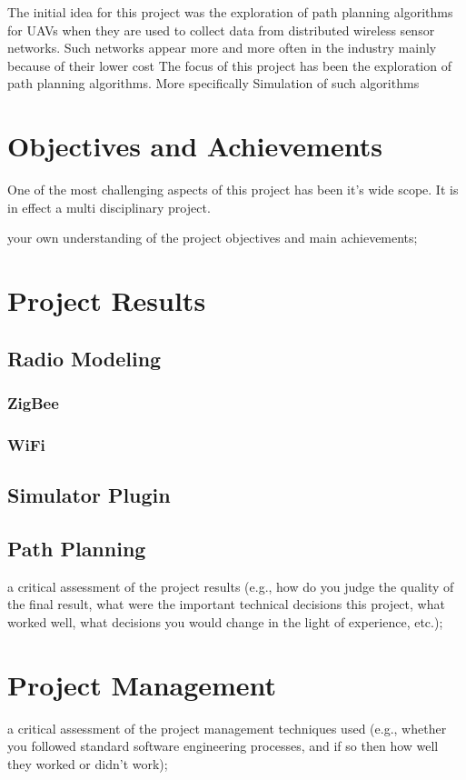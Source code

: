 The initial idea for this project was the exploration of path planning
algorithms for UAVs when they are used to collect data from distributed wireless
sensor networks. Such networks appear more and more often in the industry mainly
because of their lower cost
The focus of this project has been the exploration of path planning algorithms.
More specifically
Simulation of such algorithms

\section{Objectives and Achievements}
One of the most challenging aspects of this project has been it's wide scope. It
is in effect a multi disciplinary project.


your own understanding of the project objectives and main achievements;

\section{Project Results}
\subsection{Radio Modeling}
\subsubsection{ZigBee}
\subsubsection{WiFi}
\subsection{Simulator Plugin}
\subsection{Path Planning}
a critical assessment of the project results (e.g., how do you judge the
quality of the final result, what were the important technical decisions
this project, what worked well, what decisions you would change in the light
of experience, etc.);

\section{Project Management}
a critical assessment of the project management techniques used (e.g.,
whether you followed standard software engineering processes, and if so then
how well they worked or didn't work);

